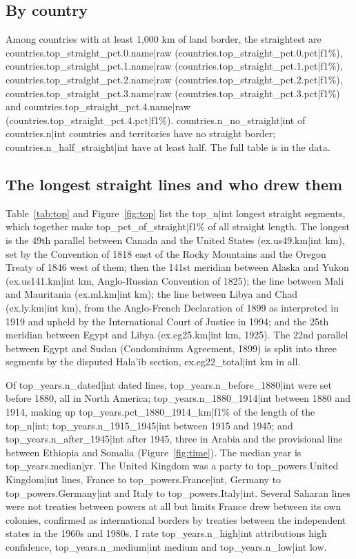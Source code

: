 \documentclass[11pt,a4paper]{article}
\begin{document}
\subsection{By country}
Among countries with at least 1,000 km of land border, the straightest are {{countries.top_straight_pct.0.name|raw}} ({{countries.top_straight_pct.0.pct|f1}}\%), {{countries.top_straight_pct.1.name|raw}} ({{countries.top_straight_pct.1.pct|f1}}\%), {{countries.top_straight_pct.2.name|raw}} ({{countries.top_straight_pct.2.pct|f1}}\%), {{countries.top_straight_pct.3.name|raw}} ({{countries.top_straight_pct.3.pct|f1}}\%) and {{countries.top_straight_pct.4.name|raw}} ({{countries.top_straight_pct.4.pct|f1}}\%). {{countries.n_no_straight|int}} of {{countries.n|int}} countries and territories have no straight border; {{countries.n_half_straight|int}} have at least half. The full table is in the data.

\subsection{The longest straight lines and who drew them}
Table~\ref{tab:top} and Figure~\ref{fig:top} list the {{top_n|int}} longest straight segments, which together make {{top_pct_of_straight|f1}}\% of all straight length. The longest is the 49th parallel between Canada and the United States ({{ex.us49.km|int}} km), set by the Convention of 1818 east of the Rocky Mountains and the Oregon Treaty of 1846 west of them; then the 141st meridian between Alaska and Yukon ({{ex.us141.km|int}} km, Anglo-Russian Convention of 1825); the line between Mali and Mauritania ({{ex.ml.km|int}} km); the line between Libya and Chad ({{ex.ly.km|int}} km), from the Anglo-French Declaration of 1899 as interpreted in 1919 and upheld by the International Court of Justice in 1994; and the 25th meridian between Egypt and Libya ({{ex.eg25.km|int}} km, 1925). The 22nd parallel between Egypt and Sudan (Condominium Agreement, 1899) is split into three segments by the disputed Hala'ib section, {{ex.eg22_total|int}} km in all.

Of {{top_years.n_dated|int}} dated lines, {{top_years.n_before_1880|int}} were set before 1880, all in North America; {{top_years.n_1880_1914|int}} between 1880 and 1914, making up {{top_years.pct_1880_1914_km|f1}}\% of the length of the {{top_n|int}}; {{top_years.n_1915_1945|int}} between 1915 and 1945; and {{top_years.n_after_1945|int}} after 1945, three in Arabia and the provisional line between Ethiopia and Somalia (Figure~\ref{fig:time}). The median year is {{top_years.median|yr}}. The United Kingdom was a party to {{top_powers.United Kingdom|int}} lines, France to {{top_powers.France|int}}, Germany to {{top_powers.Germany|int}} and Italy to {{top_powers.Italy|int}}. Several Saharan lines were not treaties between powers at all but limits France drew between its own colonies, confirmed as international borders by treaties between the independent states in the 1960s and 1980s. I rate {{top_years.n_high|int}} attributions high confidence, {{top_years.n_medium|int}} medium and {{top_years.n_low|int}} low.
\end{document}
